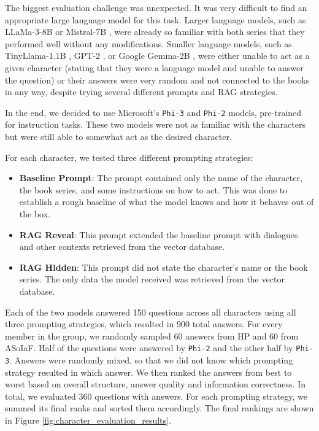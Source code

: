 \documentclass[fleqn,moreauthors,10pt]{ds_report}
\begin{document}
The biggest evaluation challenge was unexpected.
It was very difficult to find an appropriate large language model for this task.
Larger language models, such as LLaMa-3-8B \cite{llama3modelcard} or Mistral-7B \cite{jiang2023mistral}, were already so familiar with both series that they performed well without any modifications.
Smaller language models, such as TinyLlama-1.1B \cite{zhang2024tinyllama}, GPT-2 \cite{radford2019language}, or Google Gemma-2B \cite{gemma_2024}, were either unable to act as a given character (stating that they were a language model and unable to answer the question) or their answers were very random and not connected to the books in any way, despite trying several different prompts and RAG strategies.

In the end, we decided to use Microsoft's \texttt{Phi-3} \cite{abdin2024phi} and \texttt{Phi-2} models, pre-trained for instruction tasks. These two models were not as familiar with the characters but were still able to somewhat act as the desired character.

For each character, we tested three different prompting strategies:
\begin{itemize}
	\item \textbf{Baseline Prompt}: The prompt contained only the name of the character, the book series, and some instructions on how to act. This was done to establish a rough baseline of what the model knows and how it behaves out of the box.
	\item \textbf{RAG Reveal}: This prompt extended the baseline prompt with dialogues and other contexts retrieved from the vector database.
	\item \textbf{RAG Hidden}: This prompt did not state the character's name or the book series. The only data the model received was retrieved from the vector database.
\end{itemize}


Each of the two models answered 150 questions across all characters using all three prompting strategies, which resulted in 900 total answers.
For every member in the group, we randomly sampled 60 answers from HP and 60 from ASoIaF.
Half of the questions were answered by \texttt{Phi-2} and the other half by \texttt{Phi-3}.
Answers were randomly mixed, so that we did not know which prompting strategy resulted in which answer.
We then ranked the answers from best to worst based on overall structure, answer quality and information correctness.
In total, we evaluated 360 questions with  answers.
For each prompting strategy, we summed its final ranks and sorted them accordingly.
The final rankings are shown in Figure \ref{fig:character_evaluation_results}.
\end{document}
